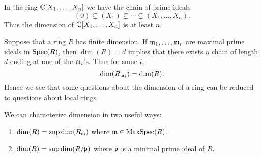 \documentclass{ximera}
\begin{document}
\begin{example}
  In the ring $\mathbb C[X_1,\dots,X_n]$ we have the chain of prime ideals
  \[
  (0) \subsetneq (X_1) \subsetneq \cdots \subsetneq (X_1,\dots,X_n).
  \]
  Thus the dimension of $\mathbb C[X_1,\dots,X_n]$ is at least $n$.
\end{example}


Suppose that a ring $R$ has finite dimension. If $\mathfrak{m}_1, \dots, \mathfrak{m}_r$
are maximal prime ideals in $\operatorname{Spec}(R)$, then $\dim(R) = d$ implies
that there exists a chain of length $d$ ending at one of the $\mathfrak{m}_i$'s.
Thus for some $i$,
\[
\dim(R_{\mathfrak{m}_i}) = \dim(R). 
\]
Hence we see that some questions about the dimension of a ring can be
reduced to questions about local rings.


\begin{remark}
  We can characterize dimension in two useful ways:
  \begin{enumerate}
  \item $\dim(R) = \sup \dim(R_{\mathfrak{m}})$ where $\mathfrak{m} \in \operatorname{MaxSpec}(R)$.
  \item $\dim(R) = \sup \dim(R/\mathfrak{p})$ where $\mathfrak{p}$ is a minimal prime ideal of $R$. 
  \end{enumerate}
\end{remark}
\end{document}
